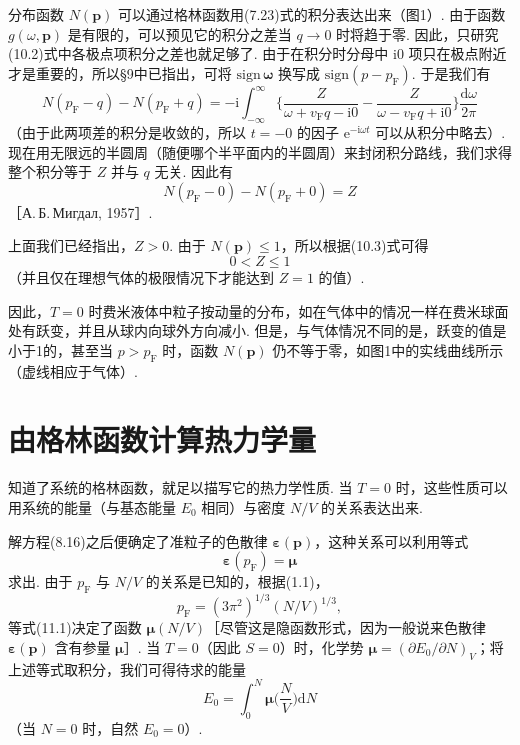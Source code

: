分布函数 $N(\bm p)$ 可以通过格林函数用(7.23)式的积分表达出来（图1）. 由于函数 $g(\omega,\bm p)$ 是有限的，可以预见它的积分之差当 $q\to0$ 时将趋于零. 因此，只研究(10.2)式中各极点项积分之差也就足够了. 由于在积分时分母中 i0 项只在极点附近才是重要的，所以§9中已指出，可将 $\mathrm{sign}\,\bm\omega$ 换写成 $\mathrm{sign}(p-p_{\mathrm F})$. 于是我们有
\begin{equation*}
N(p_{\mathrm F}-q)-N(p_{\mathrm F}+q)=-\mathrm{i}\int_{-\infty}^{\infty}\bigg\{\frac{Z}{\omega+v_{\mathrm F}q-\mathrm{i}0}-\frac{Z}{\omega-v_{\mathrm F}q+\mathrm{i}0}\bigg\}\frac{\mathrm{d}\omega}{2\pi}
\end{equation*}
（由于此两项差的积分是收敛的，所以 $t=-0$ 的因子 $\mathrm{e}^{-\mathrm{i}\omega t}$ 可以从积分中略去）. 现在用无限远的半圆周（随便哪个半平面内的半圆周）来封闭积分路线，我们求得整个积分等于 $Z$ 并与 $q$ 无关. 因此有
\begin{equation}
N(p_{\mathrm F}-0)-N(p_{\mathrm F}+0)=Z
\end{equation}
［А.\,Б.\,Мигдал, 1957］.

上面我们已经指出，$Z>0$. 由于 $N(\bm p)\leqslant1$，所以根据(10.3)式可得
\begin{equation}
0<Z\leqslant1
\end{equation}
（并且仅在理想气体的极限情况下才能达到 $Z=1$ 的值）.

因此，$T=0$ 时费米液体中粒子按动量的分布，如在气体中的情况一样在费米球面处有跃变，并且从球内向球外方向减小. 但是，与气体情况不同的是，跃变的值是小于1的，甚至当 $p>p_{\mathrm F}$ 时，函数 $N(\bm p)$ 仍不等于零，如图1中的实线曲线所示（虚线相应于气体）.

\section{由格林函数计算热力学量}

知道了系统的格林函数，就足以描写它的热力学性质. 当 $T=0$ 时，这些性质可以用系统的能量（与基态能量 $E_0$ 相同）与密度 $N/V$ 的关系表达出来.

解方程(8.16)之后便确定了准粒子的色散律 $\bm\varepsilon(\bm p)$，这种关系可以利用等式
\begin{equation}
\bm\varepsilon(p_{\mathrm F})=\bm\mu
\end{equation}
求出. 由于 $p_{\mathrm F}$ 与 $N/V$ 的关系是已知的，根据(1.1)，
\begin{equation}
p_{\mathrm F}=(3\pi^2)^{1/3}(N/V)^{1/3},
\end{equation}
等式(11.1)决定了函数 $\bm\mu(N/V)$［尽管这是隐函数形式，因为一般说来色散律 $\bm\varepsilon(\bm p)$ 含有参量 $\bm\mu$］. 当 $T=0$（因此 $S=0$）时，化学势 $\bm\mu=(\partial E_0/\partial N)_V$；将上述等式取积分，我们可得待求的能量
\begin{equation}
E_0=\int_0^N\bm\mu\Big(\frac{N}{V}\Big)\mathrm{d}N
\end{equation}
（当 $N=0$ 时，自然 $E_0=0$）.

